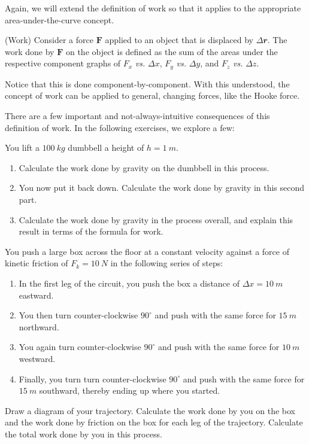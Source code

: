 Again, we will extend the definition of work so that it applies to the appropriate area-under-the-curve concept. 
\begin{definition}(Work)
Consider a force $𝐅$ applied to an object that is displaced by $Δ 𝒓$. The work done by $𝐅$ on the object is defined as the sum of the areas under the respective component graphs of $F_x$ {\it vs.} $Δx$, $F_y$ {\it vs.} $Δy$, and $F_z$ {\it vs.} $Δz$.
\end{definition}
Notice that this is done component-by-component. With this understood, the concept of work can be applied to general, changing forces, like the Hooke force. 

There are a few important and not-always-intuitive consequences of this definition of work. In the following exercises, we explore a few:
\begin{exercise}
You lift a $100\ kg$ dumbbell a height of $h=1\ m$. 
\begin{enumerate}
\item Calculate the work done by gravity on the dumbbell in this process. 
\item You now put it back down. Calculate the work done by gravity in this second part. 
\item Calculate the work done by gravity in the process overall, and explain this result in terms of the formula for work.
\end{enumerate}
\end{exercise}


\begin{exercise}
\label{Ex:NonConservative}
You push a large box across the floor at a constant velocity against a force of kinetic friction of $F_k = 10\ N$ in the following series of steps:
\begin{enumerate}
\item In the first leg of the circuit, you push the box a distance of $Δx = 10\ m$ eastward. 
\item You then turn counter-clockwise $90^∘$ and push with the same force for $15\ m$ northward. 
\item You again turn counter-clockwise $90^∘$ and push with the same force for $10\ m$ westward. 
\item Finally, you turn turn counter-clockwise $90^∘$ and push with the same force for $15\ m$ southward, thereby ending up where you started. 
\end{enumerate}
Draw a diagram of your trajectory. Calculate the work done by you on the box and the work done by friction on the box for each leg of the trajectory. Calculate the total work done by you in this process. 
\end{exercise}

